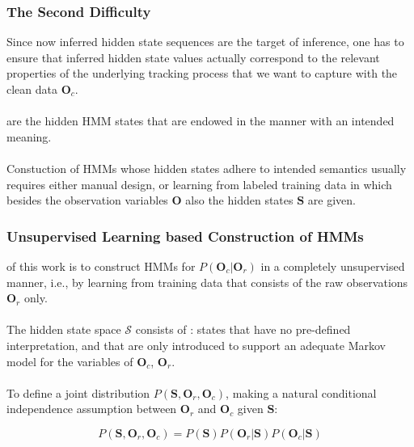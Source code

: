 
\begin{frame}
\frametitle{The Second Difficulty}

Since now inferred hidden state sequences are the target of inference, one has to ensure that inferred hidden state values actually correspond to the relevant properties of the underlying tracking process that we want to capture with the clean data $\mathbf{O}_c$.\\~\\

 are the hidden HMM states that are endowed in the manner with an intended meaning.\\~\\

Constuction of HMMs whose hidden states adhere to intended semantics usually requires either manual design, or learning from labeled training data in which besides the observation variables $\mathbf{O}$ also the hidden states $\mathbf{S}$ are given.

\end{frame}


\begin{frame}
\frametitle{Unsupervised Learning based Construction of HMMs}

 of this work is  to construct HMMs for $P(\mathbf{O}_c | \mathbf{O}_r)$ in a completely unsupervised manner, i.e., by learning from training data that consists of the raw observations $\mathbf{O}_r$ only.\\~\\

The hidden state space $\mathcal{S}$ consists of : states that have no pre-defined interpretation, and that are only introduced to support an adequate Markov model for the variables of $\mathbf{O}_c$, $\mathbf{O}_r$.\\~\\

To define a joint distribution $P(\mathbf{S}, \mathbf{O}_r, \mathbf{O}_c)$, making a natural conditional independence assumption between $\mathbf{O}_r$ and $\mathbf{O}_c$ given $\mathbf{S}$: \pause

\begin{equation}
  P(\mathbf{S}, \mathbf{O}_r, \mathbf{O}_c) = P(\mathbf{S}) P(\mathbf{O}_r | \mathbf{S}) P(\mathbf{O}_c | \mathbf{S})\label{equation:joint_prob_model}
\end{equation}

\end{frame}


